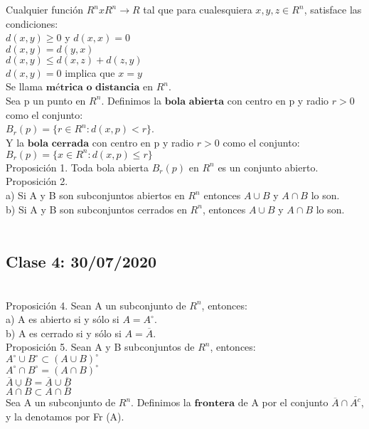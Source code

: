 \documentclass[secnumarabic,balancelastpage,amsmath,amssymb]{article}
\begin{document}
Cualquier función $R^{n} x R^{n} \rightarrow R$ tal que para cualesquiera $x, y, z \in R^{n}$, satisface las condiciones:\\
$d(x, y) \geq 0$ y $d(x, x)=0$\\
$d(x, y) =d(y, x)$\\
$d(x, y) \leq d(x, z) + d(z, y)$\\
$d(x, y) = 0$ implica que $x=y$\\
Se llama $\textbf{métrica o distancia}$ en $R^{n}$. \\
Sea p un punto en $R^{n}$. Definimos la $\textbf{bola abierta}$ con centro en p y radio $r>0$ como el conjunto:\\ $B_{r} (p) = \lbrace r \in R^{n} : d(x, p) <r \rbrace$.\\ Y la $\textbf{bola cerrada}$ con centro en p y radio $r>0$ como el conjunto: $B_{r} (p) = \lbrace x \in R^{n} : d(x, p)\leq r \rbrace$\\
Proposición 1. Toda bola abierta $B_{r} (p)$ en $R^{n}$ es un conjunto abierto. \\
Proposición 2. \\
a) Si A y B son subconjuntos abiertos en $R^{n}$ entonces $A\cup B$ y $A \cap B$ lo son. \\
b) Si A y B son subconjuntos cerrados en $R^{n}$, entonces $A\cup B$ y $A\cap B$ lo son. \\\\
\subsection{Clase 4: 30/07/2020}\\
Proposición 4. Sean A un subconjunto de $R^{n}$, entonces:\\
a) A es abierto si y sólo si $A = A^{\circ}$.\\
b) A es cerrado si y sólo si $A = \overline{A}$.\\
Proposición 5. Sean A y B subconjuntos de $R^{n}$, entonces:\\
$A^{\circ} \cup B^{\circ} \subset (A \cup B)^{\circ}$\\
$A^{\circ} \cap B^{\circ} = (A \cap B)^{\circ}$\\
$\overline{A} \cup \overline{B }=\overline {A} \cup \overline{B}$\\
$ \overline {A \cap B} \subset \overline{A} \cap \overline{B}$\\
Sea A un subconjunto de $R^{n}$. Definimos la $\textbf{frontera}$ de A por el conjunto
$\overline{A} \cap \overline{A ^{c}}$, y la denotamos por Fr (A).
\end{document}
